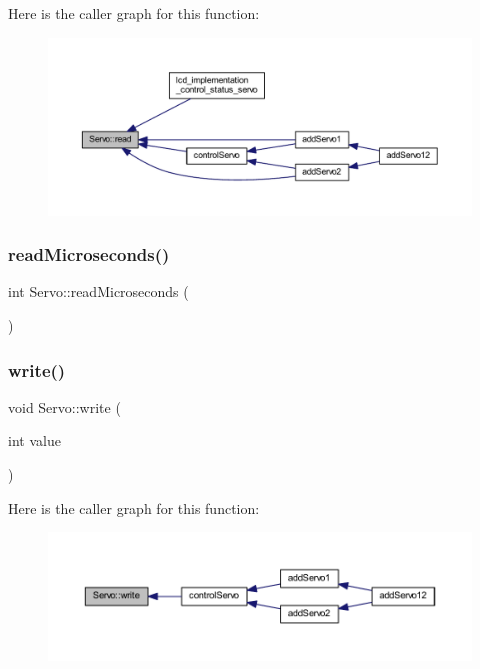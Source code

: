 Here is the caller graph for this function\+:
\nopagebreak
\begin{figure}[H]
\begin{center}
\leavevmode
\includegraphics[width=350pt]{d2/d3c/class_servo_aaca0af33ba7d7c87c8a785b8eabf95a7_icgraph}
\end{center}
\end{figure}
\mbox{\label{class_servo_a43950424d146c1414460066483d9561b}} 
\subsubsection{\texorpdfstring{read\+Microseconds()}{readMicroseconds()}}
{\footnotesize\ttfamily int Servo\+::read\+Microseconds (\begin{DoxyParamCaption}{ }\end{DoxyParamCaption})}

\mbox{\label{class_servo_a72b4b546912eada96a6ef705168ceb8a}} 
\subsubsection{\texorpdfstring{write()}{write()}}
{\footnotesize\ttfamily void Servo\+::write (\begin{DoxyParamCaption}\item[{int}]{value }\end{DoxyParamCaption})}

Here is the caller graph for this function\+:
\nopagebreak
\begin{figure}[H]
\begin{center}
\leavevmode
\includegraphics[width=350pt]{d2/d3c/class_servo_a72b4b546912eada96a6ef705168ceb8a_icgraph}
\end{center}
\end{figure}
\mbox{\label{class_servo_ac7fe3d6d2ea285ead98814bcfc417029}} 
